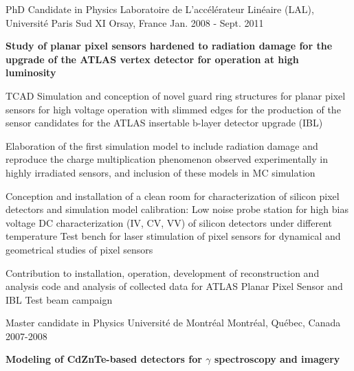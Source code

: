 \begin{cventries}
  \cventry
    {PhD Candidate in Physics} %
    {Laboratoire de L'acc\'el\'erateur Lin\'eaire (LAL), Universit\'e Paris Sud XI} %
    {Orsay, France} %
    {Jan. 2008 - Sept. 2011} %
    {
      \begin{cvitems} %
\item[ ] \begin{center}
    \textbf{Study of planar pixel sensors hardened to radiation damage  for the upgrade \newline of the ATLAS vertex detector for operation at high luminosity}\end{center}
\item TCAD Simulation and conception of novel guard ring structures for planar pixel sensors for high voltage operation with slimmed edges for the production of the  sensor candidates for the ATLAS insertable b-layer detector upgrade (IBL) 
\item Elaboration of the first simulation model to include radiation damage and reproduce the charge multiplication phenomenon observed experimentally in highly irradiated sensors, and inclusion of these models in MC simulation 
\item Conception and installation of a clean room for characterization of silicon pixel detectors and simulation model calibration:
\subitem[+] Low noise probe station for high bias voltage DC characterization (IV, CV, VV) of silicon detectors under different temperature  
\subitem[+] Test bench for laser stimulation of pixel sensors for dynamical and geometrical studies of pixel sensors 
\item Contribution to installation, operation, development of reconstruction and analysis code and analysis of collected data for ATLAS Planar Pixel Sensor and IBL Test beam campaign
      \end{cvitems}
    }
  \cventry
    {Master candidate in Physics} %
    {Universit\'e de Montr\'eal} %
    {Montr\'eal, Qu\'ebec, Canada} %
    {2007-2008} %
    {
      \begin{cvitems} %
\item[ ]  \begin{center}\textbf{Modeling of CdZnTe-based detectors for $\gamma$ spectroscopy and imagery  }\end{center}

\end{cvitems}}
\end{cventries}
